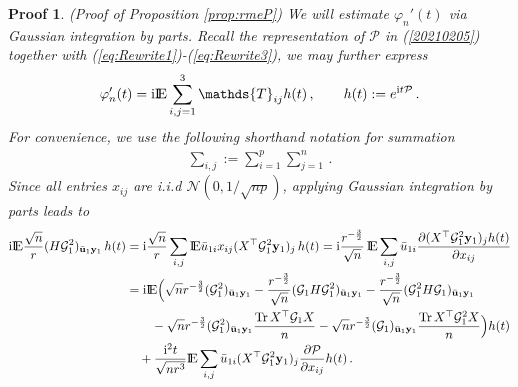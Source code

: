 \documentclass[12pt]{article}
\numberwithin{equation}{section}
\newtheorem{myPro}{Proof}
\theoremstyle{remark}
\newcommand{\1}{{\rm 1}\kern-0.24em{\rm I}}
\newcommand{\E}{{\rm I}\kern-0.18em{\rm E}}
\begin{document}
\begin{appendices}
\begin{myPro}{(Proof of Proposition  \ref{prop:rmeP})}
  We will estimate $\varphi_n'(t)$ via Gaussian integration by parts. Recall the representation of $\mathcal{P}$ in (\ref{20210205}) together with (\ref{eq:Rewrite1})-(\ref{eq:Rewrite3}), we may further express 
  \begin{align*}
  \varphi_n'(t)= \mathrm{i}\E  \sum_{i,j=1}^3 \mathds{T}_{ij} h(t)\,,\qquad h(t):= e^{\mathrm{i}t  \mathcal{P}}\,. 
  \end{align*}
  For convenience, we use the following shorthand notation for summation
  \begin{align*}
  \sum_{i,j}:=\sum_{i=1}^p \sum_{j=1}^n\,.
  \end{align*}
 Since all entries $x_{ij}$  are i.i.d $\mathcal{N}(0, 1/\sqrt{np})$, applying  Gaussian integration by parts leads to  
 \begin{align*}
 \mathrm{i} \E \frac{\sqrt n}{ r} ({H}\mathcal{G}_1^2)_{\bar{\bf u}_1{\bf y}_1}\, h(t) &=\mathrm{i} \frac{\sqrt n}{r} \sum_{i,j}  \E \bar{u}_{1i} x_{ij} ({X}^{\top}\mathcal{G}_1^2{\bf y}_1)_j \,  h(t)= \mathrm{i}\frac{r^{-\frac 32}}{\sqrt n}\, \E\sum_{i,j} \bar{u}_{1i} \frac{ \partial ({X}^{\top}\mathcal{G}_1^2{\bf y}_1)_jh(t)}{\partial x_{ij}}\notag\\
&=  \mathrm{i}\E \Big( \sqrt n r^{-\frac 32} (\mathcal{G}_1^2)_{\bar{\bf u}_1{\bf y}_1} - \frac{r^{-\frac 32}}{\sqrt n} (\mathcal{G}_1 {H}\mathcal{G}_1^2)_{\bar{\bf u}_1{\bf y}_1}- \frac{r^{-\frac 32}}{\sqrt n} (\mathcal{G}_1^2 {H}\mathcal{G}_1)_{\bar{\bf u}_1{\bf y}_1} \notag\\
&\qquad - \sqrt n r^{-\frac 32} (\mathcal{G}_1^2)_{\bar{\bf u}_1{\bf y}_1} \frac{{\rm Tr} \,{X}^{\top} \mathcal{G}_1{X}}{n} - \sqrt n  r^{-\frac 32}(\mathcal{G}_1)_{\bar{\bf u}_1{\bf y}_1} \frac{{\rm Tr} \,{X}^{\top} \mathcal{G}_1^2{X}}{n}\Big)h(t)\notag\\
&  \quad +  \frac{\mathrm{i}^2t}{\sqrt {nr^3}}\E\sum_{i,j} \bar{u}_{1i}  ({X}^{\top}\mathcal{G}_1^2{\bf y}_1)_j \frac{\partial \mathcal{P}}{\partial x_{ij}} h(t)\,.

\end{align*}
\end{myPro}
\end{appendices}
\end{document}
